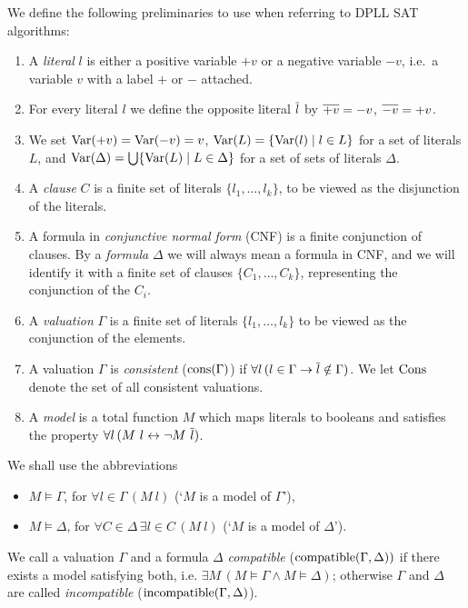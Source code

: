 \begin{mydef}[Preliminaries]
We define the following preliminaries to use when referring to DPLL SAT algorithms:

\begin{enumerate}
\item A \emph{literal} $l$ is either a positive variable $+v$ or a negative variable $-v$, i.e.\ a variable $v$ with a label $+$ or ${-}$ attached.

\item For every literal $l$ we define the opposite literal $\overline{l}$ by $\overline{+v}= -v$, $\overline{-v} = +v$. 

\item We set $\mathrm{Var}(+v) = \mathrm{Var}(-v) = v$, $\mathrm{Var}(L) = \{\mathrm{Var}(l) \mid l\in L\}$
for a set of literals $L$, and 
$\mathrm{Var}(\Delta) = \bigcup\{\mathrm{Var}(L)\mid L\in\Delta\}$ for a set of sets of 
literals $\Delta$.

\item A \emph{clause} $C$ is a finite set of literals 
$\{ l_1, \ldots , l_k \}$, to be viewed as the disjunction of the literals.

\item A formula in \emph{conjunctive normal form} (CNF) is a 
finite conjunction of clauses. 
%
By a \emph{formula} $\Delta$ we will always mean a formula in CNF,
and we will identify it with a finite set of clauses 
$\{ C_1 , \ldots , C_k \}$, representing the conjunction of the $C_i$.

\item A \emph{valuation} $\Gamma$ is a finite set of literals $\{ l_1, \ldots , l_k \}$ to be viewed as the conjunction of the elements.

\item A valuation $\Gamma$ is \emph{consistent} ($\mathrm{cons}(\Gamma)$) if 
%
$\forall l \,( l \in \Gamma \to \overline{l} \notin \Gamma)$.
We let $\mathrm{Cons}$ denote the set of all consistent valuations.


\item A \emph{model} is a total function $M$ which maps literals to booleans and satisfies the property
%
$\forall l \, (M \ l \leftrightarrow \neg M \ \mybar{l})$.
%
\end{enumerate}
%
We shall use the abbreviations 
%
\begin{itemize}
%
\item $M \models \Gamma$, for $\forall l \in \Gamma \, (M \ l)$ 
(`$M$ is a model of $\Gamma$'),
%
\item $M \models \Delta$, for 
$\forall C \in \Delta \, \exists l \in C \,(M \ l)$ 
(`$M$ is a model of $\Delta$').
%
\end{itemize}
%
We call a valuation $\Gamma$ and a formula $\Delta$ \emph{compatible} 
($\mathrm{compatible}(\Gamma,\Delta))$
if there exists a model satisfying both, i.e. 
$\exists M \, (M \models \Gamma \wedge M\models \Delta)$;
otherwise $\Gamma$ and $\Delta$ are called \emph{incompatible} 
($\mathrm{incompatible}(\Gamma,\Delta)$).


\end{mydef}
